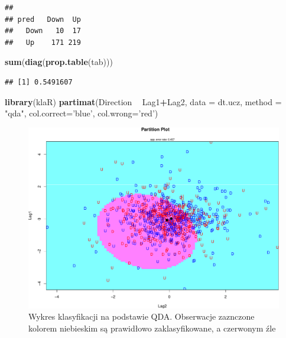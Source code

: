 \documentclass[]{book}
\newenvironment{Shaded}{\begin{snugshade}}{\end{snugshade}}
\newcommand{\DataTypeTok}[1]{\textcolor[rgb]{0.13,0.29,0.53}{#1}}
\newcommand{\KeywordTok}[1]{\textcolor[rgb]{0.13,0.29,0.53}{\textbf{#1}}}
\newcommand{\NormalTok}[1]{#1}
\newcommand{\OperatorTok}[1]{\textcolor[rgb]{0.81,0.36,0.00}{\textbf{#1}}}
\newcommand{\StringTok}[1]{\textcolor[rgb]{0.31,0.60,0.02}{#1}}
\theoremstyle{plain}
\theoremstyle{definition}
\theoremstyle{definition}
\theoremstyle{definition}
\theoremstyle{definition}
\theoremstyle{remark}
\begin{document}
\begin{verbatim}
##       
## pred   Down  Up
##   Down   10  17
##   Up    171 219
\end{verbatim}

\begin{Shaded}
\begin{Highlighting}[]
\KeywordTok{sum}\NormalTok{(}\KeywordTok{diag}\NormalTok{(}\KeywordTok{prop.table}\NormalTok{(tab)))}
\end{Highlighting}
\end{Shaded}

\begin{verbatim}
## [1] 0.5491607
\end{verbatim}

\begin{Shaded}
\begin{Highlighting}[]
\KeywordTok{library}\NormalTok{(klaR)}
\KeywordTok{partimat}\NormalTok{(Direction }\OperatorTok{~}\StringTok{ }\NormalTok{Lag1}\OperatorTok{+}\NormalTok{Lag2, }
         \DataTypeTok{data =}\NormalTok{ dt.ucz,}
         \DataTypeTok{method =} \StringTok{"qda"}\NormalTok{,}
         \DataTypeTok{col.correct=}\StringTok{'blue'}\NormalTok{,}
         \DataTypeTok{col.wrong=}\StringTok{'red'}\NormalTok{)}
\end{Highlighting}
\end{Shaded}

\begin{figure}

{\centering \includegraphics{EksploracjaDanych_files/figure-latex/qda-1} 

}

\caption{Wykres klasyfikacji na podstawie QDA. Obserwacje zaznczone kolorem niebieskim są prawidłowo zaklasyfikowane, a czerwonym źle}\label{fig:qda}
\end{figure}
\end{document}
